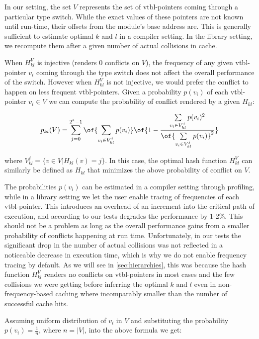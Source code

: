 In our setting, the set $V$ represents the set of vtbl-pointers coming through a 
particular type switch. While the exact values of these pointers are not known 
until run-time, their offsets from the module's base address are. This is generally 
sufficient to estimate optimal $k$ and $l$ in a compiler setting. In the library 
setting, we recompute them after a given number of actual collisions in cache.

When $H_{kl}^V$ is injective (renders 0 conflicts on $V$), the frequency of any 
given vtbl-pointer $v_i$ coming through the type switch does not affect the 
overall performance of the switch. However when $H_{kl}^V$ is not injective, we 
would prefer the conflict to happen on less frequent vtbl-pointers.
Given a probability $p(v_i)$ of each vtbl-pointer $v_i \in V$ we can compute the 
probability of conflict rendered by a given $H_{kl}$:

\begin{eqnarray*}
p_{kl}(V)=\sum\limits_{j=0}^{2^k-1}\of{\sum\limits_{v_{i} \in V^j_{kl}}p(v_i)}\of{1-\frac{\sum\limits_{v_i \in V^j_{kl}}p(v_i)^2}{\of{\sum\limits_{v_{i} \in V^j_{kl}}p(v_i)}^2}}
\end{eqnarray*}

\noindent 
where $V^j_{kl}=\{v \in V | H_{kl}(v)=j\}$. In this case, the optimal hash 
function $H_{kl}^V$ can similarly be defined as $H_{kl}$ that minimizes the 
above probability of conflict on $V$.

The probabilities $p(v_i)$ can be estimated in a compiler setting through profiling, 
while in a library setting we let the user enable tracing of frequencies of 
each vtbl-pointer. This introduces an overhead of an increment into the critical 
path of execution, and according to our tests degrades the performance by 1-2\%. 
This should not be a problem as long as the overall performance gains from a
smaller probability of conflicts happening at run time. Unfortunately, in our 
tests the significant drop in the number of actual collisions was not reflected 
in a noticeable decrease in execution time, which is why we do not enable 
frequency tracing by default. As we will see in \textsection\ref{sec:hierarchies}, 
this was because the hash function $H_{kl}^V$ renders no conflicts on 
vtbl-pointers in most cases and the few collisions we were getting before 
inferring the optimal $k$ and $l$ even in non-frequency-based caching where 
incomparably smaller than the number of successful cache hits.

Assuming uniform distribution of $v_i$ in $V$ and substituting the probability 
$p(v_i)=\frac{1}{n}$, where $n=|V|$, into the above formula we get:


